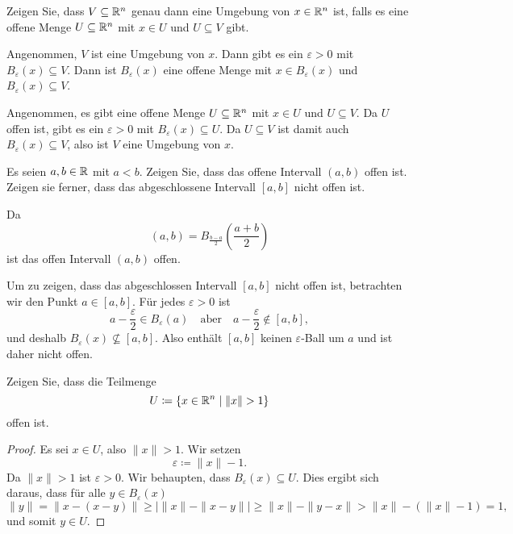\documentclass[a4paper,10pt]{article}
\begin{document}
\begin{question}
 Zeigen Sie, dass $V \subseteq \mathbb{R}^n$ genau dann eine Umgebung von $x \in \mathbb{R}^n$ ist, falls es eine offene Menge $U \subseteq \mathbb{R}^n$ mit $x \in U$ und $U \subseteq V$ gibt.
\end{question}
\begin{solution}
 Angenommen, $V$ ist eine Umgebung von $x$. Dann gibt es ein $\varepsilon > 0$ mit $B_\varepsilon(x) \subseteq V$. Dann ist $B_\varepsilon(x)$ eine offene Menge mit $x \in B_\varepsilon(x)$ und $B_\varepsilon(x) \subseteq V$.
 
 Angenommen, es gibt eine offene Menge $U \subseteq \mathbb{R}^n$ mit $x \in U$ und $U \subseteq V$. Da $U$ offen ist, gibt es ein $\varepsilon > 0$ mit $B_\varepsilon(x) \subseteq U$. Da $U \subseteq V$ ist damit auch $B_\varepsilon(x) \subseteq V$, also ist $V$ eine Umgebung von $x$.
\end{solution}


\begin{question}
 Es seien $a,b \in \mathbb{R}$ mit $a < b$. Zeigen Sie, dass das offene Intervall $(a,b)$ offen ist. Zeigen sie ferner, dass das abgeschlossene Intervall $[a,b]$ nicht offen ist.
\end{question}
\begin{solution}
 Da
 \[
  (a,b) = B_{\frac{b-a}{2}}\left(\frac{a+b}{2}\right)
 \]
 ist das offen Intervall $(a,b)$ offen.
 
 Um zu zeigen, dass das abgeschlossen Intervall $[a,b]$ nicht offen ist, betrachten wir den Punkt $a \in [a,b]$. Für jedes $\varepsilon > 0$ ist
 \[
  a - \frac{\varepsilon}{2} \in B_\varepsilon(a)
  \quad
  \text{aber}
  \quad
  a - \frac{\varepsilon}{2} \notin [a,b],
 \]
 und deshalb $B_\varepsilon(x) \nsubseteq [a,b]$. Also enthält $[a,b]$ keinen $\varepsilon$-Ball um $a$ und ist daher nicht offen.
\end{solution}


\begin{question}
 Zeigen Sie, dass die Teilmenge
 \[
  U \coloneqq \{x \in \mathbb{R}^n \mid \|x\| > 1\}
 \]
 offen ist.
\end{question}
\begin{proof}
 Es sei $x \in U$, also $\|x\| > 1$. Wir setzen
 \[
  \varepsilon \coloneqq \|x\|-1.
 \]
 Da $\|x\| > 1$ ist $\varepsilon > 0$. Wir behaupten, dass $B_\varepsilon(x) \subseteq U$. Dies ergibt sich daraus, dass für alle $y \in B_\varepsilon(x)$
 \[
  \|y\|
  = \|x - (x - y)\|
  \geq |\|x\| - \|x-y\||
  \geq \|x\| - \|y-x\|
  > \|x\| - (\|x\|-1)
  = 1,
 \]
 und somit $y \in U$.
\end{proof}
\end{document}
